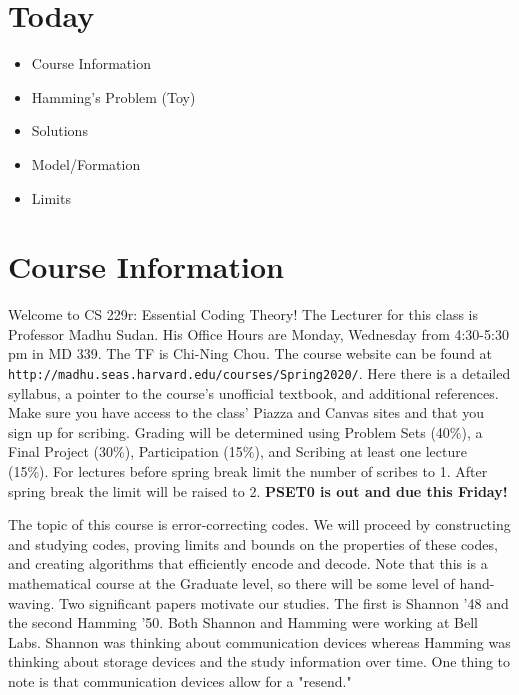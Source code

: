 \documentclass[10pt]{article}
\begin{document}

\renewcommand{\binset}{\bbF_2}


\section{Today}
\begin{itemize}
\item Course Information
\item Hamming's Problem (Toy)
\item Solutions
\item Model/Formation
\item Limits
\end{itemize}

\section{Course Information}
Welcome to CS 229r: Essential Coding Theory! The Lecturer for this class is Professor Madhu Sudan. His Office Hours are Monday, Wednesday from 4:30-5:30 pm in MD 339. The TF is Chi-Ning Chou. The course website can be found at \texttt{http://madhu.seas.harvard.edu/courses/Spring2020/}. Here there is a detailed syllabus, a pointer to the course's unofficial textbook, and additional references. Make sure you have access to the class' Piazza and Canvas sites and that you sign up for scribing. Grading will be determined using Problem Sets (40\%), a Final Project (30\%), Participation (15\%), and Scribing at least one lecture (15\%). For lectures before spring break limit the number of scribes to 1. After spring break the limit will be raised to 2. \textbf{PSET0 is out and due this Friday!}

The topic of this course is error-correcting codes. We will proceed by constructing and studying codes, proving limits and bounds on the properties of these codes, and creating algorithms that efficiently encode and decode. Note that this is a mathematical course at the Graduate level, so there will be some level of hand-waving. Two significant papers motivate our studies. The first is Shannon '48 and the second Hamming '50. Both Shannon and Hamming were working at Bell Labs. Shannon was thinking about communication devices whereas Hamming was thinking about storage devices and the study information over time. One thing to note is that communication devices allow for a "resend."
\end{document}
